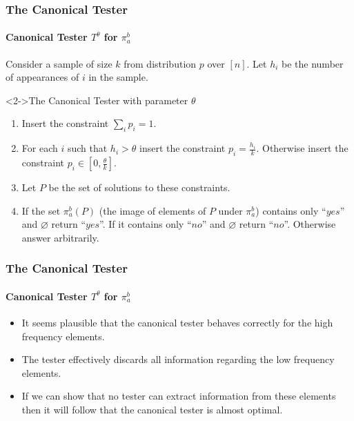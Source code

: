 \documentclass{beamer}
\begin{document}
\begin{frame}
  \frametitle{The Canonical Tester} \framesubtitle{Canonical Tester
    $T^\theta$ for $\pi_a^b$}
  Consider a sample of size $k$ from distribution $p$ over $[n]$. Let
  $h_i$ be the number of appearances of $i$ in the sample.
  \begin{block}<2->{The Canonical Tester with parameter $\theta$}
    \begin{enumerate}
    \item<3-> Insert the constraint $\sum_ip_i=1$.
    \item<4-> For each $i$ such that $h_i>\theta$ insert the constraint
      $p_i=\frac{h_i}{k}$. Otherwise insert the constraint $p_i\in
      [0,\frac{\theta}{k}]$.
    \item<5-> Let $P$ be the set of solutions to these constraints.
    \item<6-> If the set $\pi_a^b(P)$ (the image of elements of $P$
      under $\pi_a^b$) contains only ``$yes$'' and $\varnothing$ return
      ``$yes$''. If it contains only ``$no$'' and $\varnothing$ return
      ``$no$''. Otherwise answer arbitrarily.
    \end{enumerate}
  \end{block}
\end{frame}
\begin{frame}
  \frametitle{The Canonical Tester} \framesubtitle{Canonical Tester
    $T^\theta$ for $\pi_a^b$}
  \begin{block}{}
    \begin{itemize}
    \item<1-> It seems plausible that the canonical tester behaves
      correctly for the high frequency elements.
    \item<2-> The tester effectively discards all information
      regarding the low frequency elements.
    \item<3-> If we can show that no tester can extract information from
      these elements then it will follow that the canonical tester is
      almost optimal.
    \end{itemize}
  \end{block}
\end{frame}
\end{document}
